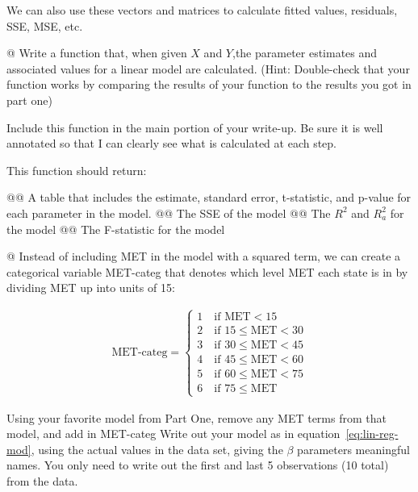 \documentclass[10pt]{article}\usepackage[]{graphicx}\usepackage[]{xcolor}
\begin{document}
We can also use these vectors and matrices to calculate fitted values, residuals, SSE, MSE, etc.

\begin{easylist}[enumerate]
    @ Write a function that, when given $X$ and $Y$,the parameter estimates and associated values for a linear model are
    calculated. (Hint: Double-check that your function works by comparing the results of your function to the results
    you got in part one)\newline

    Include this function in the main portion of your write-up. Be sure it is well annotated so that I can clearly see
    what is calculated at each step.\newline

    This function should return:

    @@ A table that includes the estimate, standard error, t-statistic, and p-value for each parameter in the
    model.\newline
    @@ The SSE of the model\newline
    @@ The $R^2$ and $R^2_a$ for the model\newline
    @@ The F-statistic for the model\newline

    @ Instead of including MET in the model with a squared term, we can create a categorical variable MET-categ that
    denotes which level MET each state is in by dividing MET up into units of 15:

    \begin{equation*}
        \begin{aligned}
            \text{MET-categ} =
            \begin{cases}
                1 \quad \text{if } \text{MET} < 15\\
                2 \quad \text{if } 15 \le \text{MET} < 30\\
                3 \quad \text{if } 30 \le \text{MET} < 45\\
                4 \quad \text{if } 45 \le \text{MET} < 60\\
                5 \quad \text{if } 60 \le \text{MET} < 75\\
                6 \quad \text{if } 75 \le \text{MET}
            \end{cases}
        \end{aligned}
    \end{equation*}

    Using your favorite model from Part One, remove any MET terms from that model, and add in MET-categ Write out your
    model as in equation~\eqref{eq:lin-reg-mod}, using the actual values in the data set, giving the $\beta$ parameters meaningful names.
    You only need to write out the first and last 5 observations (10 total) from the data.\newline


\end{easylist}
\end{document}
